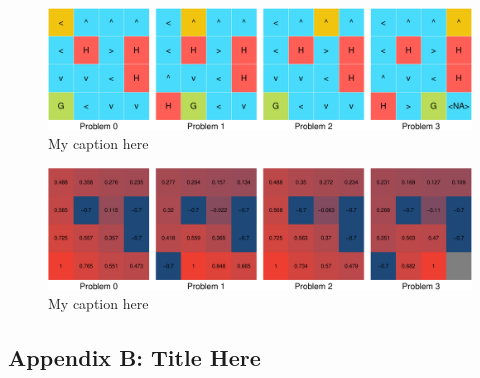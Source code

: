 \documentclass[11pt,]{article}
\begin{document}
\begin{figure}[h]

{\centering \includegraphics[width=0.9\linewidth]{project_files/figure-latex/unnamed-chunk-7-1} 

}

\caption{\label{fig:appendixa} My caption here}\label{fig:unnamed-chunk-7}
\end{figure}

\begin{figure}[h]

{\centering \includegraphics[width=0.9\linewidth]{project_files/figure-latex/unnamed-chunk-8-1} 

}

\caption{\label{fig:appendixa} My caption here}\label{fig:unnamed-chunk-8}
\end{figure}

\newpage

\subsection{Appendix B: Title Here}\label{appendix-b-title-here}
\end{document}
